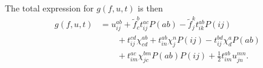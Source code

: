 \documentclass[
    a4paper, aps, twocolumn, floatfix, superscriptaddress,
    nofootinbib]{revtex4-1}
\newcommand{\1}{\mathds{1}}
\begin{document}
    The total expression for $g(f, u, t)$ is then
    \begin{equation}
        \begin{aligned}
            g(f, u, t) &=
            u^{ab}_{ij} + \tilde{f}^b_c t^{ac}_{ij}P(ab)
            - \tilde{f}^k_jt^{ab}_{ik}P(ij) \\
            &\qquad
            + t^{cd}_{ij}\chi^{ab}_{cd} + t^{ab}_{in}\chi^n_jP(ij)
            - t^{bd}_{ij}\chi^a_dP(ab)
            \\
            &\qquad
            + t^{ac}_{im}\chi^{bm}_{jc}P(ab)P(ij)
            + \frac{1}{2}t^{ab}_{im}u^{mn}_{jn}.
        \end{aligned}
    \end{equation}


%
%
%
%


\end{document}
